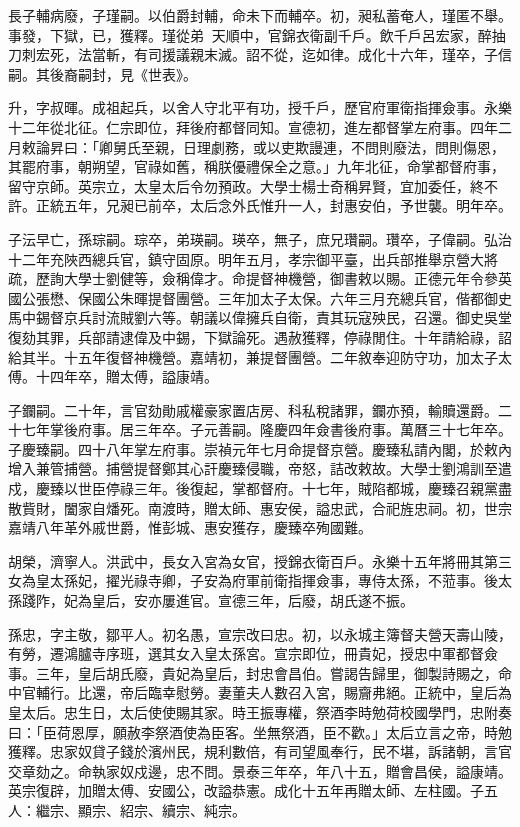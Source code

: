 \begin{pinyinscope}
長子輔病廢，子瑾嗣。以伯爵封輔，命未下而輔卒。初，昶私蓄奄人，瑾匿不舉。事發，下獄，已，獲釋。瑾從弟，天順中，官錦衣衛副千戶。飲千戶呂宏家，醉抽刀刺宏死，法當斬，有司援議親末滅。詔不從，迄如律。成化十六年，瑾卒，子信嗣。其後裔嗣封，見《世表》。

升，字叔暉。成祖起兵，以舍人守北平有功，授千戶，歷官府軍衛指揮僉事。永樂十二年從北征。仁宗即位，拜後府都督同知。宣德初，進左都督掌左府事。四年二月敕論昇曰：「卿舅氏至親，日理劇務，或以吏欺謾連，不問則廢法，問則傷恩，其罷府事，朝朔望，官祿如舊，稱朕優禮保全之意。」九年北征，命掌都督府事，留守京師。英宗立，太皇太后令勿預政。大學士楊士奇稱昇賢，宜加委任，終不許。正統五年，兄昶已前卒，太后念外氏惟升一人，封惠安伯，予世襲。明年卒。

子沄早亡，孫琮嗣。琮卒，弟瑛嗣。瑛卒，無子，庶兄瓚嗣。瓚卒，子偉嗣。弘治十二年充陜西總兵官，鎮守固原。明年五月，孝宗御平臺，出兵部推舉京營大將疏，歷詢大學士劉健等，僉稱偉才。命提督神機營，御書敕以賜。正德元年令參英國公張懋、保國公朱暉提督團營。三年加太子太保。六年三月充總兵官，偕都御史馬中錫督京兵討流賊劉六等。朝議以偉擁兵自衛，責其玩寇殃民，召還。御史吳堂復劾其罪，兵部請逮偉及中錫，下獄論死。遇赦獲釋，停祿閒住。十年請給祿，詔給其半。十五年復督神機營。嘉靖初，兼提督團營。二年敘奉迎防守功，加太子太傅。十四年卒，贈太傅，謚康靖。

子鑭嗣。二十年，言官劾勛戚權豪家置店房、科私稅諸罪，鑭亦預，輸贖還爵。二十七年掌後府事。居三年卒。子元善嗣。隆慶四年僉書後府事。萬曆三十七年卒。子慶臻嗣。四十八年掌左府事。崇禎元年七月命提督京營。慶臻私請內閣，於敕內增入兼管捕營。捕營提督鄭其心訐慶臻侵職，帝怒，詰改敕故。大學士劉鴻訓至遣戍，慶臻以世臣停祿三年。後復起，掌都督府。十七年，賊陷都城，慶臻召親黨盡散貲財，闔家自燔死。南渡時，贈太師、惠安侯，謚忠武，合祀旌忠祠。初，世宗嘉靖八年革外戚世爵，惟彭城、惠安獲存，慶臻卒殉國難。

胡榮，濟寧人。洪武中，長女入宮為女官，授錦衣衛百戶。永樂十五年將冊其第三女為皇太孫妃，擢光祿寺卿，子安為府軍前衛指揮僉事，專侍太孫，不蒞事。後太孫踐阼，妃為皇后，安亦屢進官。宣德三年，后廢，胡氏遂不振。

孫忠，字主敬，鄒平人。初名愚，宣宗改曰忠。初，以永城主簿督夫營天壽山陵，有勞，遷鴻臚寺序班，選其女入皇太孫宮。宣宗即位，冊貴妃，授忠中軍都督僉事。三年，皇后胡氏廢，貴妃為皇后，封忠會昌伯。嘗謁告歸里，御製詩賜之，命中官輔行。比還，帝后臨幸慰勞。妻董夫人數召入宮，賜齎弗絕。正統中，皇后為皇太后。忠生日，太后使使賜其家。時王振專權，祭酒李時勉荷校國學門，忠附奏曰：「臣荷恩厚，願赦李祭酒使為臣客。坐無祭酒，臣不歡。」太后立言之帝，時勉獲釋。忠家奴貸子錢於濱州民，規利數倍，有司望風奉行，民不堪，訴諸朝，言官交章劾之。命執家奴戍邊，忠不問。景泰三年卒，年八十五，贈會昌侯，謚康靖。英宗復辟，加贈太傅、安國公，改謚恭憲。成化十五年再贈太師、左柱國。子五人：繼宗、顯宗、紹宗、續宗、純宗。


\end{pinyinscope}
